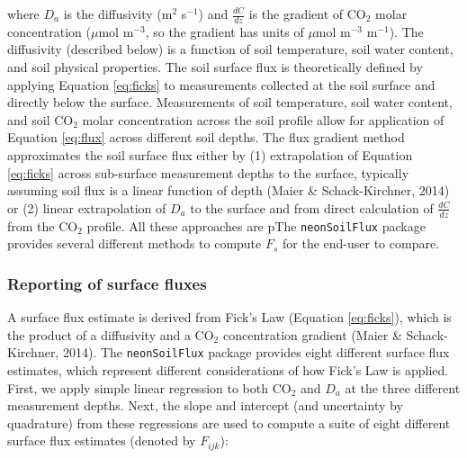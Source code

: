 \documentclass[
  letterpaper,
  DIV=11,
  numbers=noendperiod]{scrartcl}
\begin{document}
where \(D_{a}\) is the diffusivity (m\(^{2}\) s\(^{-1}\)) and
\(\frac{dC}{dz}\) is the gradient of CO\(_{2}\) molar concentration
(\(\mu\)mol m\(^{-3}\), so the gradient has units of \(\mu\)mol
m\(^{-3}\) m\(^{-1}\)). The diffusivity (described below) is a function
of soil temperature, soil water content, and soil physical properties.
The soil surface flux is theoretically defined by applying Equation
\ref{eq:ficks} to measurements collected at the soil surface and
directly below the surface. Measurements of soil temperature, soil water
content, and soil CO\(_{2}\) molar concentration across the soil profile
allow for application of Equation \ref{eq:flux} across different soil
depths. The flux gradient method approximates the soil surface flux
either by (1) extrapolation of Equation \ref{eq:ficks} across
sub-surface measurement depths to the surface, typically assuming soil
flux is a linear function of depth (Maier \& Schack-Kirchner, 2014) or
(2) linear extrapolation of \(D_{a}\) to the surface and from direct
calculation of \(\frac{dC}{dz}\) from the CO\(_{2}\) profile. All these
approaches are pThe \texttt{neonSoilFlux} package provides several
different methods to compute \(F_{s}\) for the end-user to compare.

\subsubsection{Reporting of surface
fluxes}\label{reporting-of-surface-fluxes}

A surface flux estimate is derived from Fick's Law (Equation
\ref{eq:ficks}), which is the product of a diffusivity and a CO\(_{2}\)
concentration gradient (Maier \& Schack-Kirchner, 2014). The
\texttt{neonSoilFlux} package provides eight different surface flux
estimates, which represent different considerations of how Fick's Law is
applied. First, we apply simple linear regression to both CO\(_{2}\) and
\(D_{a}\) at the three different measurement depths. Next, the slope and
intercept (and uncertainty by quadrature) from these regressions are
used to compute a suite of eight different surface flux estimates
(denoted by \(F_{ijk}\)):
\end{document}
